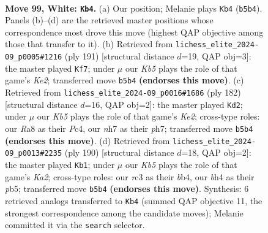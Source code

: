 \documentclass[11pt]{article}
\begin{document}
\clearpage

\begin{figure}[p]\centering
\begin{subfigure}{0.46\textwidth}\centering
\resizebox{\linewidth}{!}{%
\newchessgame
\chessboard[
  setfen={R7/7n/7p/1K2p2k/3p3b/2r5/8/8 w - - 16 99},
  showmover=false,
  pgfstyle=straightmove, color=movearrow, markmove={b5-b4}
]}
\caption{}
\end{subfigure}\hfill
\begin{subfigure}{0.46\textwidth}\centering
\resizebox{\linewidth}{!}{%
\newchessgame
\chessboard[
  setfen={8/4k3/6R1/6Pp/4BK1P/8/8/2r5 b - - 0 96},
  showmover=false,
  pgfstyle=straightmove, color=movearrow, markmove={e7-f7}
]}
\caption{}
\end{subfigure}
\\[4pt]
\begin{subfigure}{0.46\textwidth}\centering
\resizebox{\linewidth}{!}{%
\newchessgame
\chessboard[
  setfen={8/7p/5k2/2p2b2/1pP2P2/r7/4K3/8 w - - 2 92},
  showmover=false,
  pgfstyle=straightmove, color=movearrow, markmove={e2-d2}
]}
\caption{}
\end{subfigure}\hfill
\begin{subfigure}{0.46\textwidth}\centering
\resizebox{\linewidth}{!}{%
\newchessgame
\chessboard[
  setfen={8/8/2k4p/pp4p1/1b6/8/K7/8 w - - 2 96},
  showmover=false,
  pgfstyle=straightmove, color=movearrow, markmove={a2-b1}
]}
\caption{}
\end{subfigure}
\caption{\textbf{Move 99, White: \texttt{Kb4}.} (a) Our position; Melanie plays \texttt{Kb4} (\texttt{b5b4}). Panels (b)--(d) are the retrieved master positions whose correspondence most drove this move (highest QAP objective among those that transfer to it). (b) Retrieved from \texttt{lichess\_elite\_2024-09\_p0005\#1216} (ply 191) [structural distance $d$=19, QAP obj=3]: the master played \texttt{Kf7}; under $\mu$ our \emph{Kb5} plays the role of that game's \emph{Ke2}; transferred move \texttt{b5b4} \textbf{(endorses this move)}. (c) Retrieved from \texttt{lichess\_elite\_2024-09\_p0016\#1686} (ply 182) [structural distance $d$=16, QAP obj=2]: the master played \texttt{Kd2}; under $\mu$ our \emph{Kb5} plays the role of that game's \emph{Ke2}; cross-type roles: our \emph{R}a8 as their \emph{P}c4, our \emph{n}h7 as their \emph{p}h7; transferred move \texttt{b5b4} \textbf{(endorses this move)}. (d) Retrieved from \texttt{lichess\_elite\_2024-09\_p0013\#2235} (ply 190) [structural distance $d$=18, QAP obj=2]: the master played \texttt{Kb1}; under $\mu$ our \emph{Kb5} plays the role of that game's \emph{Ka2}; cross-type roles: our \emph{r}c3 as their \emph{b}b4, our \emph{b}h4 as their \emph{p}b5; transferred move \texttt{b5b4} \textbf{(endorses this move)}. Synthesis: 6 retrieved analogs transferred to \texttt{Kb4} (summed QAP objective 11, the strongest correspondence among the candidate moves); Melanie committed it via the \texttt{search} selector.}
\label{fig:thought-m196}
\end{figure}
\end{document}
